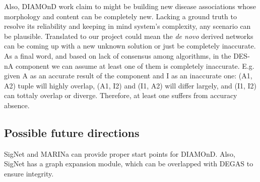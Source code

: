 Also, DIAMOnD work claim to might be building new disease associations whose morphology and content can be completely new. Lacking a ground truth to resolve its reliability and keeping in mind system’s complexity, any scenario can be plausible. Translated to our project could mean the \textit{de novo} derived networks can be coming up with a new unknown solution or just be completely inaccurate. 
\\

As a final word, and based on lack of consensus among algorithms, in the DES-nA component we can assume at least one of them is completely inaccurate. E.g. given A as an accurate result of the component and I as an inaccurate one: (A1, A2) tuple will highly overlap, (A1, I2) and (I1, A2) will differ largely, and (I1, I2) can tottaly overlap or diverge. Therefore, at least one suffers from accuracy absence.

\subsection{Possible future directions}
SigNet and MARINa can provide proper start points for DIAMOnD. Also, SigNet has a graph expansion module, which can be overlapped with DEGAS to ensure integrity.
